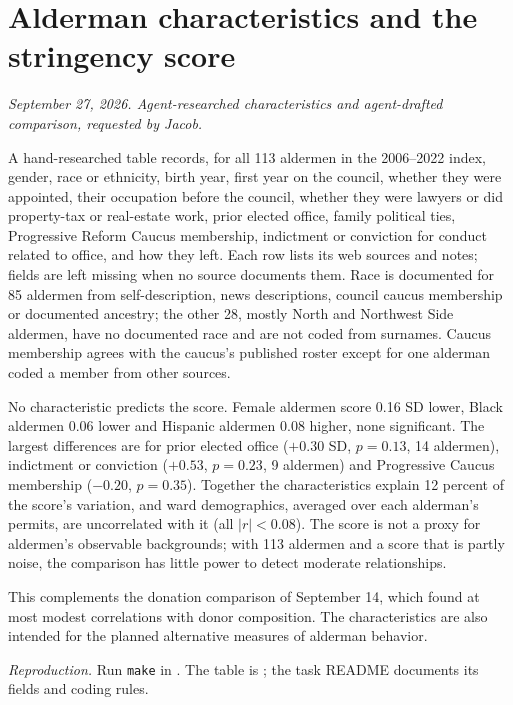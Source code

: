\clearpage
\section*{Alderman characteristics and the stringency score}
\textit{September 27, 2026. Agent-researched characteristics and agent-drafted comparison, requested by Jacob.}

A hand-researched table records, for all 113 aldermen in the 2006--2022 index, gender, race or ethnicity, birth year,
first year on the council, whether they were appointed, their occupation before the council, whether they were
lawyers or did property-tax or real-estate work, prior elected office, family political ties, Progressive Reform
Caucus membership, indictment or conviction for conduct related to office, and how they left. Each row lists its web
sources and notes; fields are left missing when no source documents them. Race is documented for 85 aldermen from
self-description, news descriptions, council caucus membership or documented ancestry; the other 28, mostly North
and Northwest Side aldermen, have no documented race and are not coded from surnames. Caucus membership agrees with
the caucus's published roster except for one alderman coded a member from other sources.

No characteristic predicts the score. Female aldermen score 0.16 SD lower, Black aldermen 0.06 lower and Hispanic
aldermen 0.08 higher, none significant. The largest differences are for prior elected office ($+0.30$ SD, $p=0.13$,
14 aldermen), indictment or conviction ($+0.53$, $p=0.23$, 9 aldermen) and Progressive Caucus membership ($-0.20$,
$p=0.35$). Together the characteristics explain 12 percent of the score's variation, and ward demographics, averaged
over each alderman's permits, are uncorrelated with it (all $|r|<0.08$). The score is not a proxy for aldermen's
observable backgrounds; with 113 aldermen and a score that is partly noise, the comparison has little power to detect
moderate relationships.

This complements the donation comparison of September 14, which found at most modest correlations with donor
composition. The characteristics are also intended for the planned alternative measures of alderman behavior.

\textit{Reproduction.} Run \texttt{make} in . The table is
; the task README documents its
fields and coding rules.
